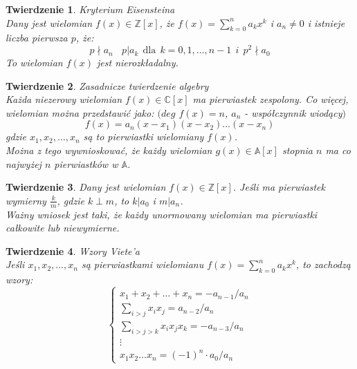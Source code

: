 \documentclass[10pt,a4paper]{article}
\newtheorem{theorem}{Twierdzenie}[section]
\newcommand{\Z}{\mathbb{Z}}
\newcommand{\C}{\mathbb{C}}
\newcommand{\A}{\mathbb{A}}
\begin{document}
\begin{theorem}{Kryterium Eisensteina}
	\\ \color{black}
	Dany jest wielomian $f(x) \in \Z[x]$, że $f(x)=\sum_{k=0}^n a_kx^k$ i $a_n \neq 0$ i istnieje liczba pierwsza $p$, że: 
	$$p \nmid a_n ~~~~ p|a_k ~~ \text{dla} ~~ k=0,1,\ldots,n-1 ~~ i ~~ p^2 \nmid a_0$$
	To wielomian $f(x)$ jest nierozkładalny.
\end{theorem}
\begin{theorem}{Zasadnicze twierdzenie algebry}
	\\
	\color{black}
	Każda niezerowy wielomian $f(x) \in \C[x]$ ma pierwiastek zespolony. Co więcej, wielomian można przedstawić jako: $(deg$ $f(x)=n$, $a_n$ - współczynnik wiodący$)$
	$$f(x)=a_n(x-x_1)(x-x_2)\ldots(x-x_n)$$
	gdzie $x_1,x_2,\ldots,x_n$ są to pierwiastki wielomiany $f(x)$. 
	\\ Można z tego wywnioskować, że każdy wielomian $g(x) \in \A[x]$ stopnia $n$ ma co najwyżej $n$ pierwiastków w $\A$.
\end{theorem}
\begin{theorem}
	\color{black}
	Dany jest wielomian $f(x) \in \Z[x]$. Jeśli ma pierwiastek wymierny $\frac{k}{m}$, gdzie $k \perp m$, to $k|a_0$ i $m|a_n$. 
	\\ Ważny wniosek jest taki, że każdy unormowany wielomian ma pierwiastki całkowite lub niewymierne.
\end{theorem}
\begin{theorem}{Wzory Viete'a}
	\\
	\color{black}
	Jeśli $x_1,x_2,\ldots,x_n$ są pierwiastkami wielomianu $f(x) = \sum_{k=0}^{n}a_kx^k$, to zachodzą wzory:
	$$
	\left\{ \begin{array}{ll}
		x_1+x_2+\ldots+x_n=-{a_{n-1}}/{a_n} \\
		\sum_{i>j}x_ix_j=a_{n-2}/a_n \\
		\sum_{i>j>k}x_ix_jx_k=-a_{n-3}/a_n\\
		\vdots \\
		x_1x_2\ldots x_n=(-1)^n \cdot a_0/a_n
		\end{array} \right.	
	$$
\end{theorem}
\end{document}
